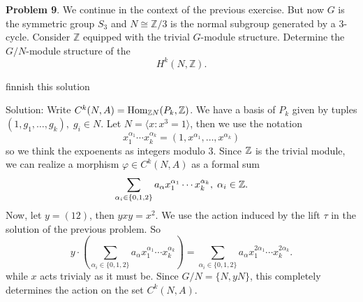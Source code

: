 \begin{dang}
    \textbf{Problem 9}.
We continue in the context of the previous exercise. But now $G$ is
the symmetric group $S_3$ and $N \cong \mathbb{Z}/3$ is the normal
subgroup generated by a $3$-cycle. Consider $\mathbb{Z}$ equipped with
the trivial $G$-module structure. Determine the $G/N$-module structure
of the
\[
H^k(N,\mathbb{Z}).
\]
\end{dang}
\TODO finnish this solution\par
Solution: Write $C^k(N,A)=\text{Hom}_{\mathbb{Z} N}(P_k,\mathbb{Z})$. We have a basis of $P_k$ given by tuples 
$(1,g_1,\dots,g_k),\;g_i\in N$. Let $N=\langle x:x^3=1\rangle$, then we use the notation 
\begin{equation}
    x_1^{\alpha_1}\cdots x_k^{\alpha_k}=(1, x^{\alpha_1},\dots,x^{\alpha_k})
\end{equation}
so we think the expoenents as integers modulo $3$. Since $\mathbb{Z}$ is the trivial module, we can realize a morphism 
$\varphi\in C^k(N,A)$ as a formal sum 
\begin{equation}
    \sum_{\alpha_i\in\{0,1,2\}}a_\alpha x_1^{\alpha_1}\cdots x_k^{\alpha_k},\;\alpha_i\in\mathbb{Z}.
\end{equation}
Now, let $y=(12)$, then $yxy=x^2$. We use the action induced by the lift $\tau$ in the solution of the previous problem. So 
\begin{equation}
    y\cdot ( \sum_{\alpha_i\in\{0,1,2\}}a_\alpha x_1^{\alpha_1}\cdots x_k^{\alpha_k}) = \sum_{\alpha_i\in\{0,1,2\}}a_\alpha x_1^{2\alpha_1}\cdots x_k^{2\alpha_k}.
\end{equation}
while $x$ acts trivialy as it must be.
Since $G/N=\{N,yN\}$, this completely determines the action on the set $C^k(N,A)$.




